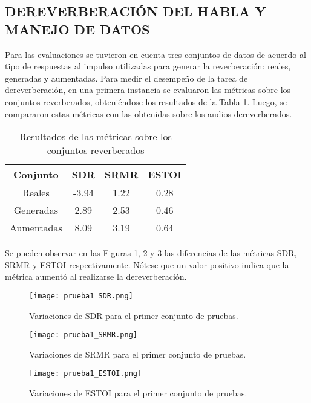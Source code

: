 \subsection[Dereverberación del habla y manejo de datos]{DEREVERBERACIÓN DEL HABLA Y MANEJO DE DATOS}

Para las evaluaciones se tuvieron en cuenta tres conjuntos de datos de acuerdo al tipo de respuestas al impulso utilizadas para generar la reverberación: reales, generadas y aumentadas. Para medir el desempeño de la tarea de dereverberación, en una primera instancia se evaluaron las métricas sobre los conjuntos reverberados, obteniéndose los resultados de la Tabla \ref{table:resultados_reverb}. Luego, se compararon estas métricas con las obtenidas sobre los audios dereverberados. 

\begin{table}[H]
\centering
\caption{Resultados de las métricas sobre los conjuntos reverberados}
\begin{tabular}{|c|c|c|c|}
\hline
Conjunto   & \textbf{SDR} & \textbf{SRMR} & \textbf{ESTOI} \\ \hline
Reales     & -3.94        & 1.22          & 0.28           \\
Generadas  & 2.89        & 2.53          & 0.46           \\
Aumentadas & 8.09        & 3.19          & 0.64           \\ \hline
\end{tabular}
\label{table:resultados_reverb}
\end{table}

Se pueden observar en las Figuras \ref{fig:1_SDR}, \ref{fig:1_SRMR} y \ref{fig:1_ESTOI} las diferencias de las métricas SDR, SRMR y ESTOI respectivamente.  Nótese que un valor positivo indica que la métrica aumentó al realizarse la dereverberación.


\begin{figure}[H]
	\centering{}
	\texttt{[image: prueba1\_SDR.png]}
	\caption{Variaciones de SDR para el primer conjunto de pruebas.}
	\label{fig:1_SDR}
\end{figure}

\begin{figure}[H]
	\centering{}
	\texttt{[image: prueba1\_SRMR.png]}
	\caption{Variaciones de SRMR para el primer conjunto de pruebas.}
	\label{fig:1_SRMR}
\end{figure}

\begin{figure}[H]
	\centering{}
	\texttt{[image: prueba1\_ESTOI.png]}
	\caption{Variaciones de ESTOI para el primer conjunto de pruebas.}
	\label{fig:1_ESTOI}
\end{figure}

